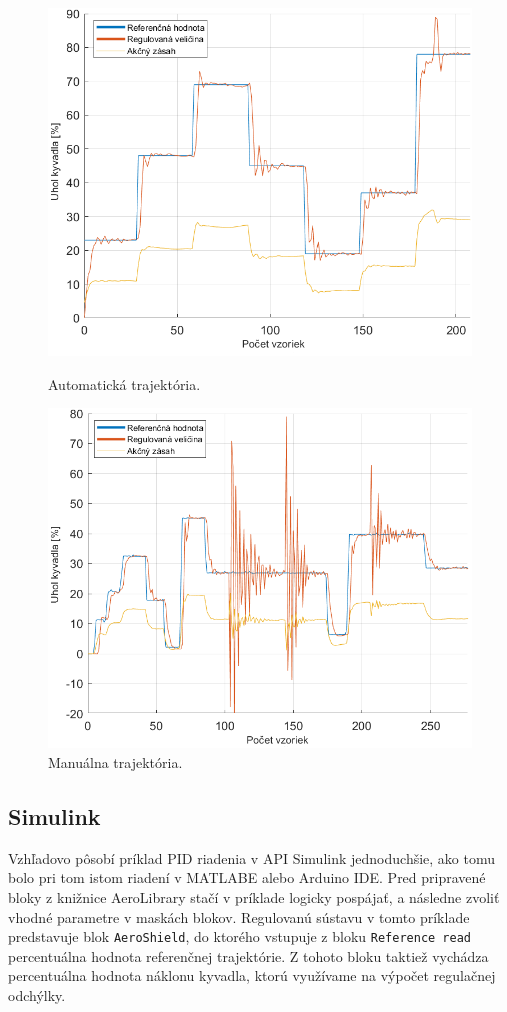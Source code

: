 \begin{figure}[!tbh]
	\centering
	\includegraphics[width=125mm]{obr/PIDautomaMat.png}
	\caption{Automatická trajektória.}\label{OBRAZOK 2.6.2}
	
	\centering
	\includegraphics[width=125mm]{obr/pidmanualbuch.png}
	\caption{Manuálna trajektória.}\label{OBRAZOK 2.6.3}
\end{figure}

\newpage 
\subsection{Simulink}

Vzhľadovo pôsobí príklad PID riadenia v API Simulink jednoduchšie, ako tomu bolo pri tom istom riadení v MATLABE alebo Arduino IDE. Pred pripravené bloky z knižnice AeroLibrary stačí v príklade logicky pospájať, a následne zvoliť vhodné parametre v maskách blokov. Regulovanú sústavu v tomto príklade predstavuje blok \verb|AeroShield|, do ktorého vstupuje z bloku \verb|Reference read| percentuálna hodnota referenčnej trajektórie. Z tohoto bloku taktiež vychádza percentuálna hodnota náklonu kyvadla, ktorú využívame na výpočet regulačnej odchýlky.  




